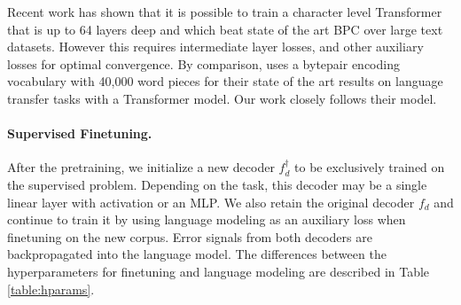 \documentclass[letterpaper]{article} %
\begin{document}
Recent work \protect\cite{DeepXformer2018} has shown that it is possible to train a character level Transformer that is up to 64 layers deep and which beat state of the art BPC over large text datasets. However this requires intermediate layer losses, and other auxiliary losses for optimal convergence. By comparison, \protect\cite{Radford2018} uses a bytepair encoding vocabulary with 40,000 word pieces for their state of the art results on language transfer tasks with a Transformer model. Our work closely follows their model.



\paragraph{Supervised Finetuning.}
After the pretraining, we initialize a new decoder $f_d^{\dagger}$ to be exclusively trained on the supervised problem. Depending on the task, this decoder may be a single linear layer with activation or an MLP. We also retain the original decoder $f_d$ and continue to train it by using language modeling as an auxiliary loss when finetuning on the new corpus. Error signals from both decoders are backpropagated into the language model. The differences between the hyperparameters for finetuning and language modeling are described in Table \ref{table:hparams}.

\begin{table}[!t]
\caption{Hyperparameters for language modeling and finetuning phases.}
\label{table:hparams}
\end{table}
\end{document}
